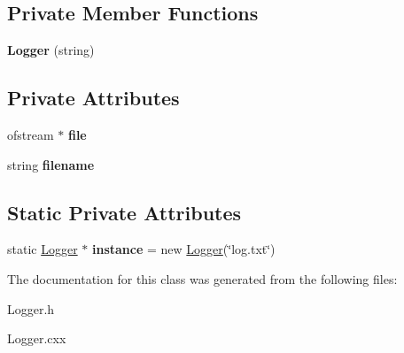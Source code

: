 \subsection*{Private Member Functions}
\begin{DoxyCompactItemize}
\item 
\hypertarget{class_logger_a717fb11db9ded613d29b4618d60fc18a}{
{\bfseries Logger} (string)}
\label{class_logger_a717fb11db9ded613d29b4618d60fc18a}

\end{DoxyCompactItemize}
\subsection*{Private Attributes}
\begin{DoxyCompactItemize}
\item 
\hypertarget{class_logger_a6e5a0f90ab88e9c527a7847c6c929518}{
ofstream $\ast$ {\bfseries file}}
\label{class_logger_a6e5a0f90ab88e9c527a7847c6c929518}

\item 
\hypertarget{class_logger_abf648bfb3d3efd642ee175f00e2e8164}{
string {\bfseries filename}}
\label{class_logger_abf648bfb3d3efd642ee175f00e2e8164}

\end{DoxyCompactItemize}
\subsection*{Static Private Attributes}
\begin{DoxyCompactItemize}
\item 
\hypertarget{class_logger_a5e9fd267cd621afeb1201131071425ea}{
static \hyperlink{class_logger}{Logger} $\ast$ {\bfseries instance} = new \hyperlink{class_logger}{Logger}(\char`\"{}log.txt\char`\"{})}
\label{class_logger_a5e9fd267cd621afeb1201131071425ea}

\end{DoxyCompactItemize}


The documentation for this class was generated from the following files:\begin{DoxyCompactItemize}
\item 
Logger.h\item 
Logger.cxx\end{DoxyCompactItemize}
